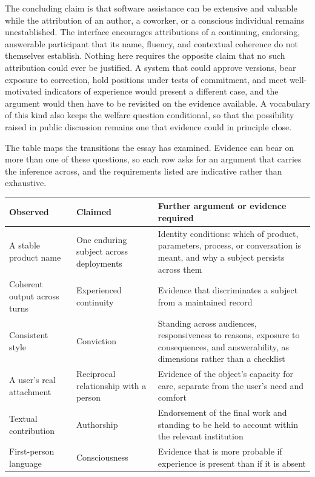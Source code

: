 \documentclass[11pt]{article}
\begin{document}
The concluding claim is that software assistance can be extensive and valuable while the attribution of an author, a coworker, or a conscious individual remains unestablished. The interface encourages attributions of a continuing, endorsing, answerable participant that its name, fluency, and contextual coherence do not themselves establish. Nothing here requires the opposite claim that no such attribution could ever be justified. A system that could approve versions, bear exposure to correction, hold positions under tests of commitment, and meet well-motivated indicators of experience would present a different case, and the argument would then have to be revisited on the evidence available. A vocabulary of this kind also keeps the welfare question conditional, so that the possibility raised in public discussion remains one that evidence could in principle close.

The table maps the transitions the essay has examined. Evidence can bear on more than one of these questions, so each row asks for an argument that carries the inference across, and the requirements listed are indicative rather than exhaustive.

\begin{center}
\small
\begin{tabular}{@{}>{\raggedright\arraybackslash}p{3.2cm}>{\raggedright\arraybackslash}p{3.4cm}>{\raggedright\arraybackslash}p{6.2cm}@{}}
\toprule
\textbf{Observed} & \textbf{Claimed} & \textbf{Further argument or evidence required}\\
\midrule
A stable product name & One enduring subject across deployments & Identity conditions: which of product, parameters, process, or conversation is meant, and why a subject persists across them\\[0.4em]
Coherent output across turns & Experienced continuity & Evidence that discriminates a subject from a maintained record\\[0.4em]
Consistent style & Conviction & Standing across audiences, responsiveness to reasons, exposure to consequences, and answerability, as dimensions rather than a checklist\\[0.4em]
A user's real attachment & Reciprocal relationship with a person & Evidence of the object's capacity for care, separate from the user's need and comfort\\[0.4em]
Textual contribution & Authorship & Endorsement of the final work and standing to be held to account within the relevant institution\\[0.4em]
First-person language & Consciousness & Evidence that is more probable if experience is present than if it is absent\\
\bottomrule
\end{tabular}
\end{center}
\end{document}
